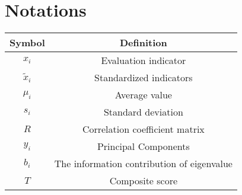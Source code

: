 \section{Notations}
\begin{table}[h]
	\begin{center}
		\begin{tabular}{cc}
			\toprule[1.5pt]
			Symbol&Definition\\
			\midrule[1pt]
			\(x_i\)&Evaluation indicator\\
			\({\tilde x_i}\)&Standardized indicators\\
			\({\mu _i}\)&Average value\\
			\(s_i\)&Standard deviation\\
			\({R}\)&Correlation coefficient matrix\\
			\(y_i\)&Principal Components\\
			\(b_i\)&The information contribution of eigenvalue\\
			\(T\)&Composite score\\
			\bottomrule[1.5pt]
		\end{tabular}
	\end{center}
\end{table}